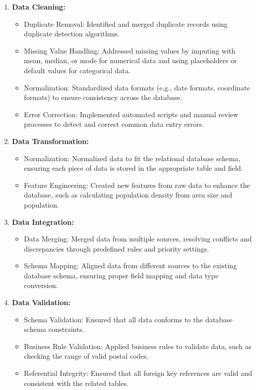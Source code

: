 \begin{enumerate}
    \item \textbf{Data Cleaning:}
    \begin{itemize}
        \item Duplicate Removal: Identified and merged duplicate records using duplicate detection algorithms.
        \item Missing Value Handling: Addressed missing values by imputing with mean, median, or mode for numerical data and using placeholders or default values for categorical data.
        \item Normalization: Standardized data formats (e.g., date formats, coordinate formats) to ensure consistency across the database.
        \item Error Correction: Implemented automated scripts and manual review processes to detect and correct common data entry errors.
    \end{itemize}
    
    \item \textbf{Data Transformation:}
    \begin{itemize}
        \item Normalization: Normalized data to fit the relational database schema, ensuring each piece of data is stored in the appropriate table and field.
        \item Feature Engineering: Created new features from raw data to enhance the database, such as calculating population density from area size and population.
    \end{itemize}
    
    \item \textbf{Data Integration:}
    \begin{itemize}
        \item Data Merging: Merged data from multiple sources, resolving conflicts and discrepancies through predefined rules and priority settings.
        \item Schema Mapping: Aligned data from different sources to the existing database schema, ensuring proper field mapping and data type conversion.
    \end{itemize}
    
    \item \textbf{Data Validation:}
    \begin{itemize}
        \item Schema Validation: Ensured that all data conforms to the database schema constraints.
        \item Business Rule Validation: Applied business rules to validate data, such as checking the range of valid postal codes.
        \item Referential Integrity: Ensured that all foreign key references are valid and consistent with the related tables.
    \end{itemize}
    

\end{enumerate}
